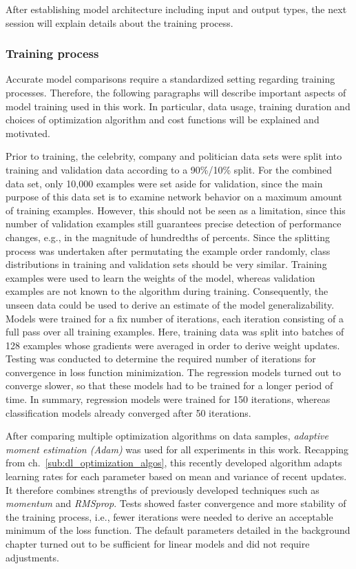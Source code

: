 After establishing model architecture including input and output types, the next
session will explain details about the training process.

\subsubsection{Training process}
\label{sub:lin_training}

Accurate model comparisons require a standardized setting regarding training
processes.
Therefore, the following paragraphs will describe important aspects of model training
used in this work.
In particular, data usage, training duration and choices of optimization
algorithm and cost functions will be explained and motivated.

Prior to training, the celebrity, company and politician data sets were split into 
training and validation data according to a 90\%/10\% split.
For the combined data set, only 10,000 examples were set aside for validation,
since the main purpose of this data set is to examine network behavior on a
maximum amount of training examples.
However, this should not be seen as a limitation, since this number of validation
examples still guarantees precise detection of performance changes, e.g.,
in the magnitude of hundredths of percents.
Since the splitting process was undertaken after permutating the example order
randomly, class distributions in training and validation sets should be very
similar.
Training examples were used to learn the weights of the model, whereas validation
examples are not known to the algorithm during training.
Consequently, the unseen data could be used to derive an estimate of the model
generalizability.
Models were trained for a fix number of iterations, each iteration consisting
of a full pass over all training examples.
Here, training data was split into batches of 128 examples whose gradients
were averaged in order to derive weight updates.
Testing was conducted to determine the required number of iterations for
convergence in loss function minimization.
The regression models turned out to converge slower, so that these models
had to be trained for a longer period of time.
In summary, regression models were trained for 150 iterations, whereas classification
models already converged after 50 iterations.

After comparing multiple optimization algorithms on data samples, \textit{adaptive
moment estimation (Adam)} was used for all experiments in this work.
Recapping from ch.~\ref{sub:dl_optimization_algos}, this recently developed
algorithm adapts learning rates for each parameter based on mean and variance of
recent updates.
It therefore combines strengths of previously developed techniques such as
\textit{momentum} and \textit{RMSprop}.
Tests showed faster convergence and more stability of the training process, i.e.,
fewer iterations were needed to derive an acceptable minimum of the loss function.
The default parameters detailed in the background chapter turned out to be sufficient
for linear models and did not require adjustments.

